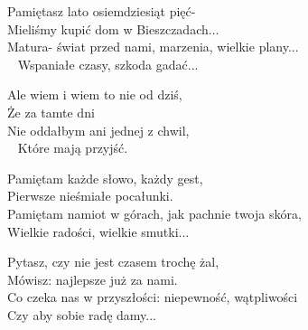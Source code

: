 \begin{text}
Pamiętasz lato osiemdziesiąt pięć- \\
Mieliśmy kupić dom w Bieszczadach... \\
Matura- świat przed nami, marzenia, wielkie plany...\\ 
Wspaniałe czasy, szkoda gadać...

\vin Ale wiem i wiem to nie od dziś,\\
\vin Że za tamte dni\\
\vin Nie oddałbym ani jednej z chwil,\\ 
\vin Które mają przyjść.

Pamiętam każde słowo, każdy gest,\\
Pierwsze nieśmiałe pocałunki.\\
Pamiętam namiot w górach, jak pachnie twoja skóra,\\
Wielkie radości, wielkie smutki...

Pytasz, czy nie jest czasem trochę żal,\\
Mówisz: najlepsze już za nami.\\
Co czeka nas w przyszłości: niepewność, wątpliwości\\
Czy aby sobie radę damy...
\end{text}